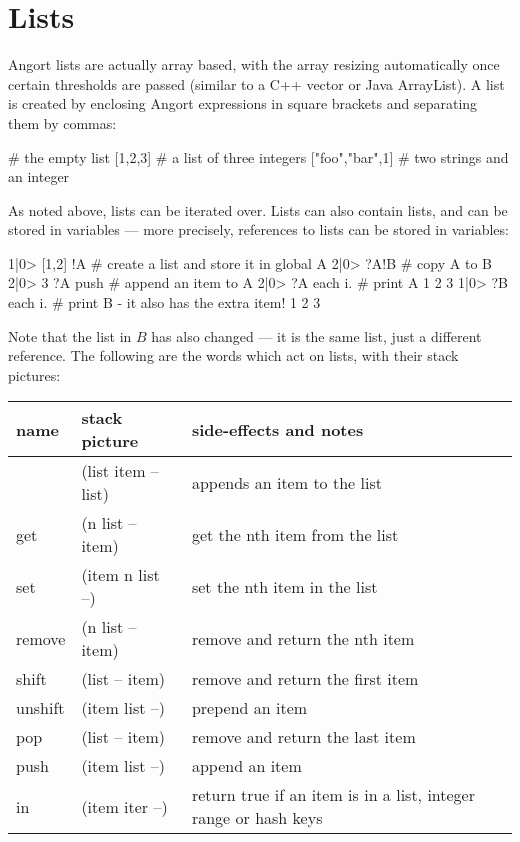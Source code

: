\section{Lists}
\indw{[|textbf}\indw{]|textbf}
Angort lists are actually array based, with the array resizing automatically
once certain thresholds are passed (similar to a C++ vector or Java ArrayList).
A list is created by enclosing Angort expressions in square
brackets and separating them by commas:
\begin{v}
[]              # the empty list
[1,2,3]         # a list of three integers
["foo","bar",1] # two strings and an integer
\end{v}
As noted above, lists can be iterated over. Lists can also contain lists,
and can be stored in variables ---  more precisely, references to lists can
be stored in variables:
\begin{v}
1|0> [1,2] !A       # create a list and store it in global A
2|0> ?A!B           # copy A to B
2|0> 3 ?A push      # append an item to A
2|0> ?A each {i.}   # print A
1
2
3
1|0> ?B each {i.}   # print B - it also has the extra item!
1
2
3
\end{v}
Note that the list in $B$ has also changed --- it is the same list,
just a different reference.
The following are the words which act on lists, with their stack pictures:
\indw{[|textbf}\indw{]|textbf}
\begin{center}
\begin{tabular}{|l|l|p{4in}|}\hline
\textbf{name} & \textbf{stack picture} & \textbf{side-effects and notes}\\ \hline
[    & (-- list)    & creates a new list\\
,    & (list item -- list) & appends an item to the list\\
]    & (list item -- list) & appends an item to the list\\
get & (n list -- item) & get the nth item from the list\\
set & (item n list --) & set the nth item in the list\\
remove & (n list -- item) & remove and return the nth item\\
shift & (list -- item) & remove and return the first item\\
unshift & (item list --) & prepend an item\\
pop & (list -- item) & remove and return the last item\\
push & (item list --) & append an item\\
in & (item iter --) & return true if an item is in a list, integer range or hash keys\\
\hline
\end{tabular}
\end{center}
